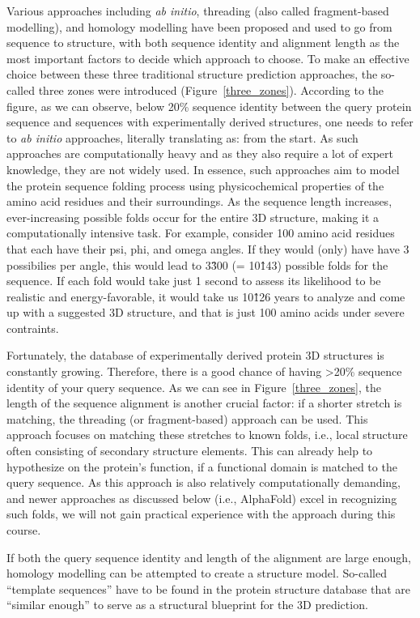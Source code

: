 Various approaches including \textit{ab initio}, threading (also called fragment-based modelling), and homology modelling have been proposed and used to go from sequence to structure, with both sequence identity and alignment length as the most important factors to decide which approach to choose.
To make an effective choice between these three traditional structure prediction approaches, the so-called three zones were introduced (Figure~\ref{three_zones}).
According to the figure, as we can observe, below 20\% sequence identity between the query protein sequence and sequences with experimentally derived structures, one needs to refer to \textit{ab initio} approaches, literally translating as: from the start.
As such approaches are computationally heavy and as they also require a lot of expert knowledge, they are not widely used.
In essence, such approaches aim to model the protein sequence folding process using physicochemical properties of the amino acid residues and their surroundings.
As the sequence length increases, ever-increasing possible folds occur for the entire 3D structure, making it a computationally intensive task.
For example, consider 100 amino acid residues that each have their psi, phi, and omega angles. If they would (only) have have 3 possibilies per angle, this would lead to 3\^300 (= 10\^143) possible folds for the sequence.
If each fold would take just 1 second to assess its likelihood to be realistic and energy-favorable, it would take us 10\^126 years to analyze and come up with a suggested 3D structure, and that is just 100 amino acids under severe contraints.

Fortunately, the database of experimentally derived protein 3D structures is constantly growing.
Therefore, there is a good chance of having \textgreater 20\% sequence identity of your query sequence.
As we can see in Figure~\ref{three_zones}, the length of the sequence alignment is another crucial factor: if a shorter stretch is matching, the threading (or fragment-based) approach can be used.
This approach focuses on matching these stretches to known folds, i.e., local structure often consisting of secondary structure elements.
This can already help to hypothesize on the protein's function, if a functional domain is matched to the query sequence.
As this approach is also relatively computationally demanding, and newer approaches as discussed below (i.e., AlphaFold) excel in recognizing such folds, we will not gain practical experience with the approach during this course.

If both the query sequence identity and length of the alignment are large enough, homology modelling can be attempted to create a structure model.
So-called ``template sequences'' have to be found in the protein structure database that are ``similar enough'' to serve as a structural blueprint for the 3D prediction.

